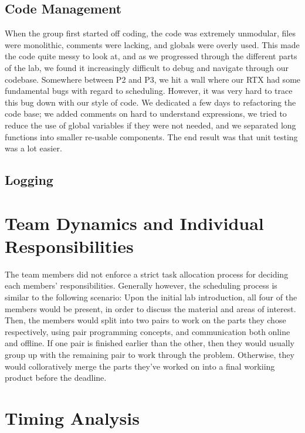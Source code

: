 \documentclass[12pt]{report}
\begin{document}
\section{Code Management}
When the group first started off coding, the code was extremely unmodular, files were monolithic, comments were lacking, and globals were overly used. This made the code quite messy to look at, and as we progressed through the different parts of the lab, we found it increasingly difficult to debug and navigate through our codebase. Somewhere between P2 and P3, we hit a wall where our RTX had some fundamental bugs with regard to scheduling. However, it was very hard to trace this bug down with our style of code. We dedicated a few days to refactoring the code base; we added comments on hard to understand expressions, we tried to reduce the use of global variables if they were not needed, and we separated long functions into smaller re-usable components. The end result was that unit testing was a lot easier.

\section{Logging}

\chapter{Team Dynamics and Individual Responsibilities}
The team members did not enforce a strict task allocation process for deciding each members' responsibilities. Generally however, the scheduling process is similar to the following scenario:
Upon the initial lab introduction, all four of the members would be present, in order to discuss the material and areas of interest. Then, the members would split into two pairs to work on the parts they chose respectively, using pair programming concepts, and communication both online and offline. If one pair is finished earlier than the other, then they would usually group up with the remaining pair to work through the problem. Otherwise, they would colloratively merge the parts they've worked on into a final workiing product before the deadline.

\chapter{Timing Analysis}
\end{document}
